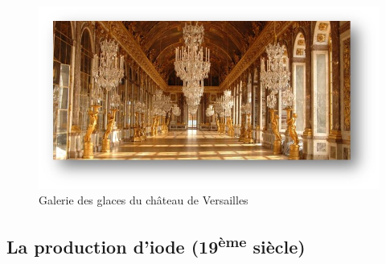 \documentclass[
]{book}
\begin{document}
\begin{figure}

{\centering \includegraphics[width=10.5in]{images/galerie des glaces} 

}

\caption{Galerie des glaces du château de Versailles}\label{fig:versailles}
\end{figure}

\hypertarget{la-production-diode-19uxe8me-siuxe8cle}{%
\subsection{\texorpdfstring{La production d'iode (19\textsuperscript{ème} siècle)}{La production d'iode (19ème siècle)}}\label{la-production-diode-19uxe8me-siuxe8cle}}
\end{document}
